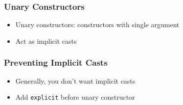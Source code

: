 \documentclass{../ucll-slides}
\begin{document}





\begin{frame}
  \frametitle{Unary Constructors}
  \begin{itemize}
    \item Unary constructors: constructors with single argument
    \item Act as implicit casts
  \end{itemize}
  \vskip5mm
  \begin{overprint}
  \end{overprint}
\end{frame}

\begin{frame}
  \frametitle{Preventing Implicit Casts}
  \begin{itemize}
    \item Generally, you don't want implicit casts
    \item Add {\tt explicit} before unary constructor
  \end{itemize}
\end{frame}
\end{document}
